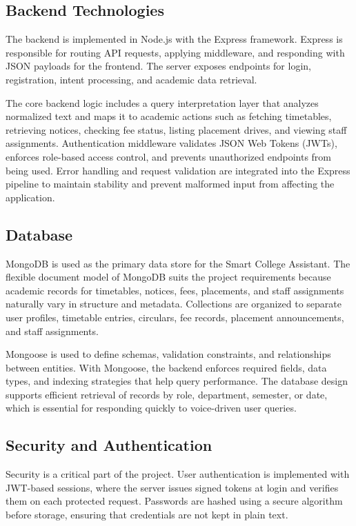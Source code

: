 \documentclass{article}
\begin{document}
\subsection{Backend Technologies}
The backend is implemented in Node.js with the Express framework. Express is responsible for routing API requests, applying middleware, and responding with JSON payloads for the frontend. The server exposes endpoints for login, registration, intent processing, and academic data retrieval.

The core backend logic includes a query interpretation layer that analyzes normalized text and maps it to academic actions such as fetching timetables, retrieving notices, checking fee status, listing placement drives, and viewing staff assignments. Authentication middleware validates JSON Web Tokens (JWTs), enforces role-based access control, and prevents unauthorized endpoints from being used. Error handling and request validation are integrated into the Express pipeline to maintain stability and prevent malformed input from affecting the application.

\subsection{Database}
MongoDB is used as the primary data store for the Smart College Assistant. The flexible document model of MongoDB suits the project requirements because academic records for timetables, notices, fees, placements, and staff assignments naturally vary in structure and metadata. Collections are organized to separate user profiles, timetable entries, circulars, fee records, placement announcements, and staff assignments.

Mongoose is used to define schemas, validation constraints, and relationships between entities. With Mongoose, the backend enforces required fields, data types, and indexing strategies that help query performance. The database design supports efficient retrieval of records by role, department, semester, or date, which is essential for responding quickly to voice-driven user queries.

\subsection{Security and Authentication}
Security is a critical part of the project. User authentication is implemented with JWT-based sessions, where the server issues signed tokens at login and verifies them on each protected request. Passwords are hashed using a secure algorithm before storage, ensuring that credentials are not kept in plain text.
\end{document}
